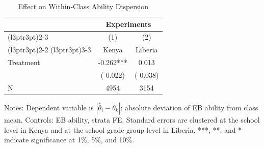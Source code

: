 \begin{table}[H]
\centering
\caption{Effect on Within-Class Ability Dispersion}
\label{tab:dispersion}
\begin{threeparttable}
\begin{tabular}[t]{lcc}
\toprule
\multicolumn{1}{c}{ } & \multicolumn{2}{c}{Experiments} \\
\cmidrule(l{3pt}r{3pt}){2-3}
\multicolumn{1}{c}{ } & \multicolumn{1}{c}{(1)} & \multicolumn{1}{c}{(2)} \\
\cmidrule(l{3pt}r{3pt}){2-2} \cmidrule(l{3pt}r{3pt}){3-3}
 & \multicolumn{1}{c}{Kenya} & \multicolumn{1}{c}{Liberia} \\
\midrule
Treatment &  -0.262*** &   0.013 \\
 & (  0.022) & (  0.038) \\
\addlinespace
N & 4954 & 3154 \\
\bottomrule
\end{tabular}
\begin{tablenotes}[para]
\item Notes: Dependent variable is $|\hat{\theta}_i - \bar{\theta}_k|$: absolute deviation of EB ability from class mean. Controls: EB ability, strata FE\@. Standard errors are clustered at the school level in Kenya and at the school grade group level in Liberia. ***, **, and * indicate significance at 1\%, 5\%, and 10\%.
\end{tablenotes}
\end{threeparttable}
\end{table}
